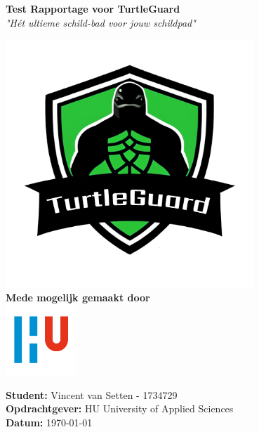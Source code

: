 \documentclass[a4paper]{report}
\newcommand{\turtleguard}{\mbox{TurtleGuard\texttrademark}\xspace}
\begin{document}
\begin{titlepage}
    \begin{center}
        \vspace*{.9cm}
        \Huge
        \textbf{ Test Rapportage voor \turtleguard }\\
        \vspace{0.2cm}
        \small\textit{"Hét ultieme schild-bad voor jouw schildpad"}

        \normalsize


        
        \includegraphics[width=0.7\textwidth]{Images/turtleguard.png}
        \vspace{1cm}
        \Large\\
        \textbf{Mede mogelijk gemaakt door} \\
        \includegraphics[width=0.2\textwidth]{Images/logouni.png}


        \vfill
      \end{center}
        \textbf{Student:} Vincent van Setten - 1734729 \\
        \textbf{Opdrachtgever:} HU University of Applied Sciences\\
        \textbf{Datum:} \today \\
        \vspace{2cm}
\end{titlepage}
\end{document}
